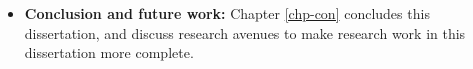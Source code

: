 \begin{itemize}

\item \textbf{Conclusion and future work:} Chapter \ref{chp-con} concludes this
dissertation, and discuss research avenues to make research work in this
dissertation more complete.

\end{itemize}
